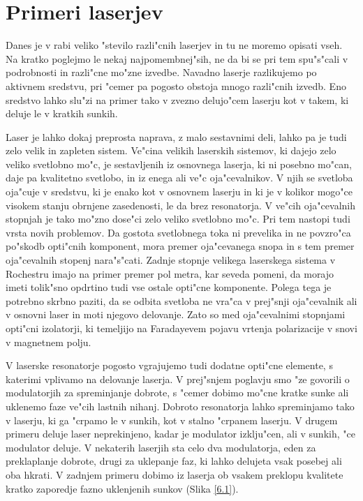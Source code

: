 \chapter{Primeri laserjev}
\label{chap:Primeri}
Danes je v rabi veliko "stevilo razli"cnih laserjev in tu ne moremo opisati
vseh. Na kratko poglejmo le nekaj najpomembnej"sih, ne da bi se pri tem
spu"s"cali v podrobnosti in razli"cne mo"zne izvedbe. Navadno laserje
razlikujemo po aktivnem sredstvu, pri "cemer pa pogosto obstoja mnogo
razli"cnih izvedb. Eno sredstvo lahko slu"zi na primer tako v zvezno
delujo"cem laserju kot v takem, ki deluje le v kratkih sunkih.

Laser je lahko dokaj preprosta naprava, z malo sestavnimi deli, lahko pa je
tudi zelo velik in zapleten sistem. Ve"cina velikih laserskih sistemov, ki
dajejo zelo veliko svetlobno mo"c, je sestavljenih iz osnovnega laserja, ki
ni posebno mo"can, daje pa kvalitetno svetlobo, in iz enega ali ve"c
oja"cevalnikov. V njih se svetloba oja"cuje v sredstvu, ki je enako kot v
osnovnem laserju in ki je v kolikor mogo"ce visokem stanju obrnjene
zasedenosti, le da brez resonatorja. V ve"cih oja"cevalnih stopnjah je tako
mo"zno dose"ci zelo veliko svetlobno mo"c. Pri tem nastopi tudi vrsta novih
problemov. Da gostota svetlobnega toka ni prevelika in ne povzro"ca po"skodb
opti"cnih komponent, mora premer oja"cevanega snopa in s tem premer
oja"cevalnih stopenj nara"s"cati. Zadnje stopnje velikega laserskega sistema
v Rochestru imajo na primer premer pol metra, kar seveda pomeni, da morajo
imeti tolik"sno opdrtino tudi vse ostale opti"cne komponente. Polega tega je
potrebno skrbno paziti, da se odbita svetloba ne vra"ca v prej"snji
oja"cevalnik ali v osnovni laser in moti njegovo delovanje. Zato so med
oja"cevalnimi stopnjami opti"cni izolatorji, ki temeljijo na Faradayevem
pojavu vrtenja polarizacije v snovi v magnetnem polju.

V laserske resonatorje pogosto vgrajujemo tudi dodatne opti"cne elemente, s
katerimi vplivamo na delovanje laserja. V prej"snjem poglavju smo "ze
govorili o modulatorjih za spreminjanje dobrote, s "cemer dobimo mo"cne
kratke sunke ali uklenemo faze ve"cih lastnih nihanj. Dobroto resonatorja
lahko spreminjamo tako v laserju, ki ga "crpamo le v sunkih, kot v stalno
"crpanem laserju. V drugem primeru deluje laser neprekinjeno, kadar je
modulator izklju"cen, ali v sunkih, "ce modulator deluje. V nekaterih
laserjih sta celo dva modulatorja, eden za preklaplanje dobrote, drugi za
uklepanje faz, ki lahko delujeta vsak posebej ali oba hkrati. V zadnjem
primeru dobimo iz laserja ob vsakem preklopu kvalitete kratko zaporedje
fazno uklenjenih sunkov (Slika \ref{6.1}).

